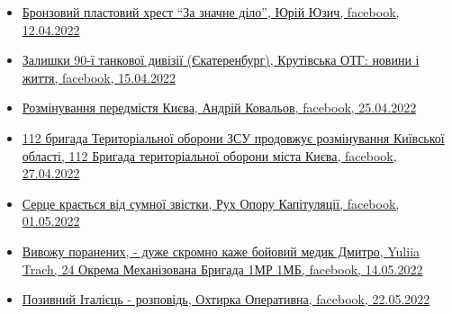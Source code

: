 \begin{itemize} %

\item \hyperlink{12_04_2022.fb.juzych_jurij.1.plast_krest_nagrada}{%
Бронзовий пластовий хрест \enquote{За значне діло}, Юрій Юзич, facebook, 12.04.2022%
}



\item \hyperlink{15_04_2022.fb.krutivska_otg.1.zalyshky_divizii_ekaterinburg}{%
Залишки 90-ї танкової дивізії (Єкатеренбург), Крутівська ОТГ: новини і життя, %
facebook, 15.04.2022%
}

\item \hyperlink{25_04_2022.fb.kovalov_andrij.1.razminirovanie_predmestij_kieva}{%
Розмінування передмістя Києва, Андрій Ковальов, facebook, 25.04.2022%
}

\item \hyperlink{27_04_2022.fb.teroborona_ua.kiev.112.br.1.rozminuvannja_kiev_obl}{%
112 бригада Територіальної оборони ЗСУ продовжує розмінування Київської області, %
112 Бригада територіальної оборони міста Києва, facebook, 27.04.2022%
}

\item \hyperlink{01_05_2022.fb.fb_group.ruh_oporu_kapituljacii.1.smert_ruslan_borovik}{%
Серце крається від сумної звістки, Рух Опору Капітуляції, facebook, 01.05.2022%
}

\item \hyperlink{14_05_2022.fb.fb_group.ua.armia.24_ombr.1mp.1mb.1.medik}{%
Вивожу поранених, - дуже скромно каже бойовий медик Дмитро, Yuliia Trach, 24 Окрема Механізована Бригада 1МР 1МБ, %
facebook, 14.05.2022%
}

\item \hyperlink{22_05_2022.fb.fb_group.ohtyrka_operatyvna.1.pozyvnyj_italiec}{%
Позивний Італієць - розповідь, Охтирка Оперативна, facebook, 22.05.2022%
}

\end{itemize} %
